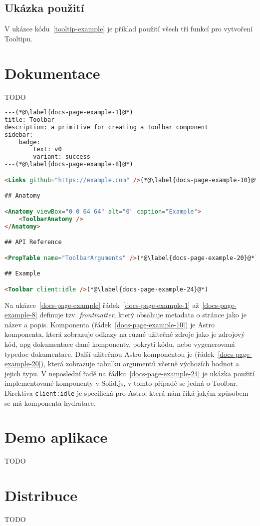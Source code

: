 \subsection{Ukázka použití}

V ukázce kódu~\ref{tooltip-example} je příklad použití všech tří funkcí pro vytvoření Tooltipu.

\clearpage

\section{Dokumentace}

TODO

\begin{lstlisting}[caption={Ukázka stránky dokumentace psané v MDX}, label={docs-page-example}, language=html]
---(*@\label{docs-page-example-1}@*)
title: Toolbar
description: a primitive for creating a Toolbar component
sidebar:
    badge:
        text: v0
        variant: success
---(*@\label{docs-page-example-8}@*)

<Links github="https://example.com" />(*@\label{docs-page-example-10}@*)

## Anatomy

<Anatomy viewBox="0 0 64 64" alt="0" caption="Example">
    <ToolbarAnatomy />
</Anatomy>

## API Reference

<PropTable name="ToolbarArguments" />(*@\label{docs-page-example-20}@*)

## Example

<Toolbar client:idle />(*@\label{docs-page-example-24}@*)
\end{lstlisting}

Na ukázce~\ref{docs-page-example} řádek~\ref{docs-page-example-1} až~\ref{docs-page-example-8} definuje tzv. \textit{frontmatter}, který obsahuje metadata o stránce jako je název a popis.
Komponenta  (řádek~\ref{docs-page-example-10}) je Astro komponenta, která zobrazuje odkazy na různé užitečné zdroje jako je zdrojový kód, \gls{apg} dokumentace dané komponenty, pokrytí kódu, nebo vygenerovaná typedoc dokumentace.
Další užitečnou Astro komponentou je  (řádek~\ref{docs-page-example-20}), která zobrazuje tabulku argumentů včetně výchozích hodnot a jejich typu.
V neposlední řadě na řádku~\ref{docs-page-example-24} je ukázka použití implementované komponenty v Solid.js, v tomto případě se jedná o Toolbar.
Direktiva \texttt{client:idle} je specifická pro Astro, která nám říká jakým způsobem se má komponenta \gls{hydratace}.

\section{Demo aplikace}

TODO

\section{Distribuce}

TODO
